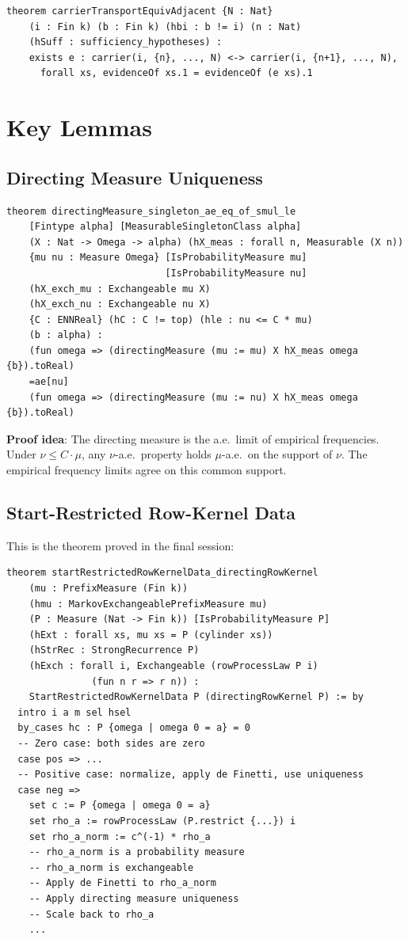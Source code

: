 \documentclass[11pt,a4paper]{article}
\theoremstyle{definition}
\begin{document}
\begin{lstlisting}
theorem carrierTransportEquivAdjacent {N : Nat}
    (i : Fin k) (b : Fin k) (hbi : b != i) (n : Nat)
    (hSuff : sufficiency_hypotheses) :
    exists e : carrier(i, {n}, ..., N) <-> carrier(i, {n+1}, ..., N),
      forall xs, evidenceOf xs.1 = evidenceOf (e xs).1
\end{lstlisting}

\section{Key Lemmas}

\subsection{Directing Measure Uniqueness}

\begin{lstlisting}
theorem directingMeasure_singleton_ae_eq_of_smul_le
    [Fintype alpha] [MeasurableSingletonClass alpha]
    (X : Nat -> Omega -> alpha) (hX_meas : forall n, Measurable (X n))
    {mu nu : Measure Omega} [IsProbabilityMeasure mu]
                            [IsProbabilityMeasure nu]
    (hX_exch_mu : Exchangeable mu X)
    (hX_exch_nu : Exchangeable nu X)
    {C : ENNReal} (hC : C != top) (hle : nu <= C * mu)
    (b : alpha) :
    (fun omega => (directingMeasure (mu := mu) X hX_meas omega {b}).toReal)
    =ae[nu]
    (fun omega => (directingMeasure (mu := nu) X hX_meas omega {b}).toReal)
\end{lstlisting}

\textbf{Proof idea}: The directing measure is the a.e.\ limit of empirical
frequencies. Under $\nu \leq C \cdot \mu$, any $\nu$-a.e.\ property holds
$\mu$-a.e.\ on the support of $\nu$. The empirical frequency limits agree
on this common support.

\subsection{Start-Restricted Row-Kernel Data}

This is the theorem proved in the final session:

\begin{lstlisting}
theorem startRestrictedRowKernelData_directingRowKernel
    (mu : PrefixMeasure (Fin k))
    (hmu : MarkovExchangeablePrefixMeasure mu)
    (P : Measure (Nat -> Fin k)) [IsProbabilityMeasure P]
    (hExt : forall xs, mu xs = P (cylinder xs))
    (hStrRec : StrongRecurrence P)
    (hExch : forall i, Exchangeable (rowProcessLaw P i)
               (fun n r => r n)) :
    StartRestrictedRowKernelData P (directingRowKernel P) := by
  intro i a m sel hsel
  by_cases hc : P {omega | omega 0 = a} = 0
  -- Zero case: both sides are zero
  case pos => ...
  -- Positive case: normalize, apply de Finetti, use uniqueness
  case neg =>
    set c := P {omega | omega 0 = a}
    set rho_a := rowProcessLaw (P.restrict {...}) i
    set rho_a_norm := c^(-1) * rho_a
    -- rho_a_norm is a probability measure
    -- rho_a_norm is exchangeable
    -- Apply de Finetti to rho_a_norm
    -- Apply directing measure uniqueness
    -- Scale back to rho_a
    ...
\end{lstlisting}
\end{document}

